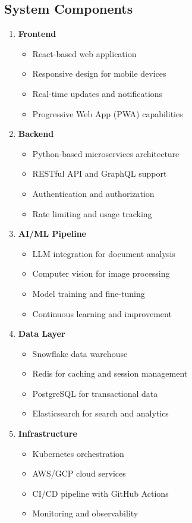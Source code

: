 \documentclass[business]{../templates/infraradar-main}
\begin{document}
\subsection{System Components}
\begin{enumerate}
    \item \textbf{Frontend}
    \begin{itemize}
        \item React-based web application
        \item Responsive design for mobile devices
        \item Real-time updates and notifications
        \item Progressive Web App (PWA) capabilities
    \end{itemize}
    
    \item \textbf{Backend}
    \begin{itemize}
        \item Python-based microservices architecture
        \item RESTful API and GraphQL support
        \item Authentication and authorization
        \item Rate limiting and usage tracking
    \end{itemize}
    
    \item \textbf{AI/ML Pipeline}
    \begin{itemize}
        \item LLM integration for document analysis
        \item Computer vision for image processing
        \item Model training and fine-tuning
        \item Continuous learning and improvement
    \end{itemize}
    
    \item \textbf{Data Layer}
    \begin{itemize}
        \item Snowflake data warehouse
        \item Redis for caching and session management
        \item PostgreSQL for transactional data
        \item Elasticsearch for search and analytics
    \end{itemize}
    
    \item \textbf{Infrastructure}
    \begin{itemize}
        \item Kubernetes orchestration
        \item AWS/GCP cloud services
        \item CI/CD pipeline with GitHub Actions
        \item Monitoring and observability
    \end{itemize}
\end{enumerate}
\end{document}
